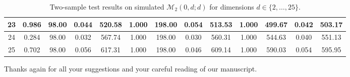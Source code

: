 \documentclass[12pt]{article}
\numberwithin{equation}{section}
\numberwithin{table}{section}
\numberwithin{thm}{section}
\numberwithin{defn}{section}
\numberwithin{lem}{section}
\numberwithin{prop}{section}
\numberwithin{cor}{section}
\numberwithin{rem}{section}
\begin{document}
\begin{sidewaystable}[htbp]
\begin{tabular}{|c|cccc|cccc|cccc|}
23 & \multicolumn{1}{c|}{0.986} & \multicolumn{1}{c|}{98.00} & \multicolumn{1}{c|}{0.044} & 520.58 & \multicolumn{1}{c|}{1.000} & \multicolumn{1}{c|}{198.00} & \multicolumn{1}{c|}{0.054} & 513.53 & \multicolumn{1}{c|}{1.000} & \multicolumn{1}{c|}{499.67} & \multicolumn{1}{c|}{0.042} & 503.17 \\ \hline
24 & \multicolumn{1}{c|}{0.284} & \multicolumn{1}{c|}{98.00} & \multicolumn{1}{c|}{0.032} & 567.74 & \multicolumn{1}{c|}{1.000} & \multicolumn{1}{c|}{198.00} & \multicolumn{1}{c|}{0.030} & 560.31 & \multicolumn{1}{c|}{1.000} & \multicolumn{1}{c|}{544.63} & \multicolumn{1}{c|}{0.040} & 551.13 \\ \hline
25 & \multicolumn{1}{c|}{0.702} & \multicolumn{1}{c|}{98.00} & \multicolumn{1}{c|}{0.056} & 617.31 & \multicolumn{1}{c|}{1.000} & \multicolumn{1}{c|}{198.00} & \multicolumn{1}{c|}{0.046} & 609.14 & \multicolumn{1}{c|}{1.000} & \multicolumn{1}{c|}{590.03} & \multicolumn{1}{c|}{0.054} & 595.95 \\ \hline
\end{tabular}
\caption{Two-sample test results on simulated $\mathcal{M}_2(0, d; d)$ for dimensions $d \in \{ 2, \dots, 25 \}$.} \label{ta:differentdimensions}
\label{ta:highd}
\end{sidewaystable}


\bigskip
\bigskip
\noindent
Thanks again for all your suggestions and your careful reading of our manuscript.


\small
%

% 





\end{document}
